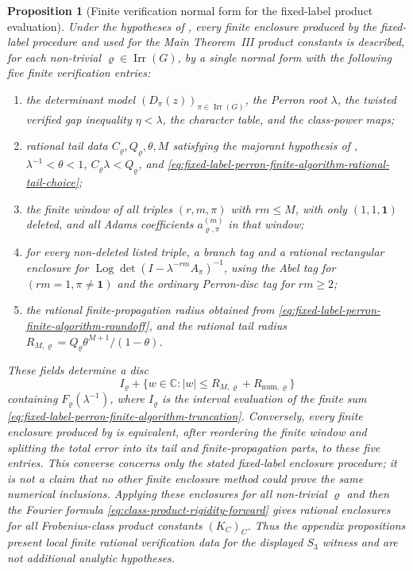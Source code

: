 \documentclass[11pt,a4paper]{amsart}
\theoremstyle{plain}
\newtheorem{proposition}[theorem]{Proposition}
\theoremstyle{definition}
\theoremstyle{remark}
\DeclareMathOperator{\Irr}{Irr}
\DeclareMathOperator{\Log}{Log}
\newcommand{\CC}{\mathbb{C}}
\begin{document}
\begin{proposition}[Finite verification normal form for the fixed-label product evaluation]\label{prop:fixed-label-certificate-normal-form}
\label{cor:fixed-label-product-certificate-record}
\label{cor:fixed-label-product-enclosure-check}
\label{cor:fixed-label-five-field-rational-record}
  Under the hypotheses of , every finite
  enclosure produced by the fixed-label procedure and used for the
  Main Theorem~III product constants is described, for each non-trivial
  \(\varrho\in\Irr(G)\), by a single normal form with the following five finite
  verification entries:
  \begin{enumerate}[label=\textup{(\roman*)},leftmargin=*]
    \item the determinant model
      \((D_\pi(z))_{\pi\in\Irr(G)}\), the Perron root \(\lambda\), the twisted
      verified gap inequality \(\eta<\lambda\), the character table, and the
      class-power maps;
    \item rational tail data \(C_\varrho,Q_\varrho,\theta,M\) satisfying the
      majorant hypothesis of ,
      \(\lambda^{-1}<\theta<1\), \(C_\varrho\lambda<Q_\varrho\), and
      \eqref{eq:fixed-label-perron-finite-algorithm-rational-tail-choice};
    \item the finite window of all triples \((r,m,\pi)\) with \(rm\le M\), with
      only \((1,1,\mathbf1)\) deleted, and all Adams coefficients
      \(a_{\varrho,\pi}^{(m)}\) in that window;
    \item for every non-deleted listed triple, a branch tag and a rational
      rectangular enclosure for
      \(\Log\det(I-\lambda^{-rm}A_\pi)^{-1}\), using the Abel tag for
      \((rm=1,\pi\ne\mathbf1)\) and the ordinary Perron-disc tag for
      \(rm\ge2\);
    \item the rational finite-propagation radius obtained from
      \eqref{eq:fixed-label-perron-finite-algorithm-roundoff}, and the rational
      tail radius \(R_{M,\varrho}=Q_\varrho\theta^{M+1}/(1-\theta)\).
  \end{enumerate}
  These fields determine a disc
  \[
    I_\varrho+
    \{w\in\CC:|w|\le R_{M,\varrho}+R_{\mathrm{num},\varrho}\}
  \]
  containing \(F_\varrho(\lambda^{-1})\), where \(I_\varrho\) is the interval
  evaluation of the finite sum
  \eqref{eq:fixed-label-perron-finite-algorithm-truncation}.  Conversely,
  every finite enclosure produced by
   is equivalent, after
  reordering the finite window and splitting the total error into its tail and
  finite-propagation parts, to these five entries.  This converse concerns only the stated fixed-label enclosure procedure; it is
  not a claim that no other finite enclosure method could prove the same
  numerical inclusions.  Applying these
  enclosures for all non-trivial \(\varrho\) and then the Fourier formula
  \eqref{eq:class-product-rigidity-forward} gives rational enclosures for all
  Frobenius-class product constants \((K_C)_C\).  Thus the appendix propositions present local finite rational verification data for the displayed \(S_3\) witness and are
  not additional analytic hypotheses.
\end{proposition}
\end{document}
